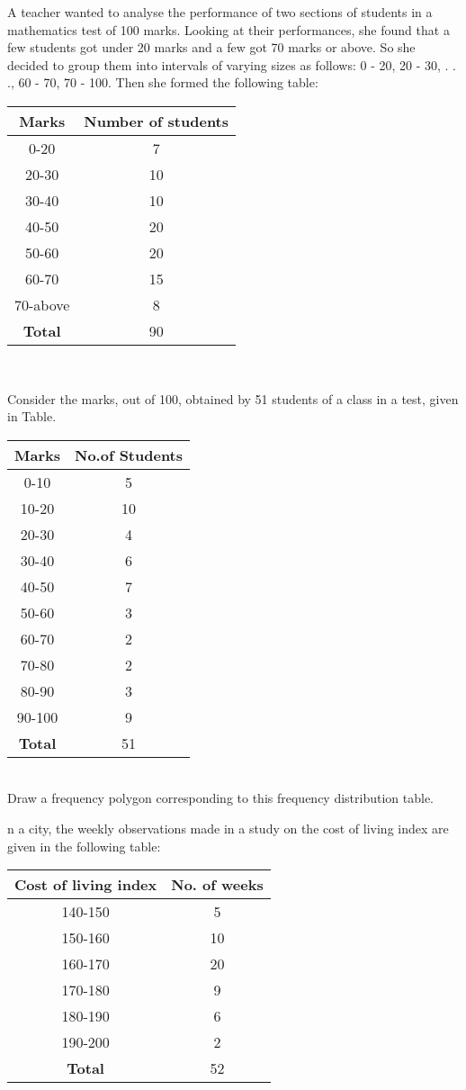 \item A teacher wanted to analyse the performance of two sections of students in a mathematics test of 100 marks. Looking at their performances, she found that a few students got under 20 marks and a few got 70 marks or above. So she decided to
group them into intervals of varying sizes as follows: 0 - 20, 20 - 30, . . ., 60 - 70, 70 - 100. Then she formed the following table:\\
\begin{tabular}{|c|c|}
\hline
\textbf{Marks} &\textbf{Number of students}\\
\hline
0-20 &7\\
20-30 &10\\
30-40 &10\\
40-50 &20\\
50-60 &20\\
60-70 &15\\
70-above &8\\
\hline
\textbf{Total} &90\\
\hline
\end{tabular}\\
\item Consider the marks, out of 100, obtained by 51 students of a class in a test, given in Table.\\
\begin{tabular}{|c|c|}
\hline
\textbf{Marks} &\textbf{No.of Students}\\
\hline

0-10 &5\\
10-20 &10\\
20-30 &4\\
30-40 &6\\
40-50 &7\\
50-60 &3\\
60-70 &2\\
70-80 &2\\
80-90 &3\\
90-100 &9\\
\hline
\textbf{Total} &51\\
\hline
\end{tabular}\\

Draw a frequency polygon corresponding to this frequency distribution table.\\

\item n a city, the weekly observations made in a study on the cost of living index are given in the following table:\\
\begin{tabular}{|c|c|}
\hline
\textbf{Cost of living index} &\textbf{No. of weeks}\\
\hline
140-150 &5\\
150-160 &10\\
160-170 &20\\
170-180 &9\\
180-190 &6\\
190-200 &2\\
\hline
\textbf{Total} &52\\
\hline
\end{tabular}\\


